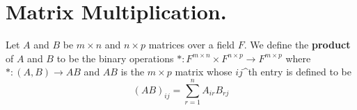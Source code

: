 
\section{Matrix Multiplication.}
\label{section1}

\begin{definition}
    Let $A$ and  $B$ be  $m \times n$ and  $n \times p$ matrices over a field  $F$. 
    We define the \textbf{product} of $A$ and  $B$ to be the binary operations  $\ast:F^{m \times n}
    \times F^{n \times p} \rightarrow F^{m \times p}$ where $\ast:(A,B) \rightarrow AB$ and $AB$ is the  $m \times p$ matrix
    whose $ij$^{th} entry is defined to be
        \begin{equation}
            (AB)_{ij}=\sum_{r=1}^n{A_{ir}B_{rj}}
        \end{equation}
\end{definition}

